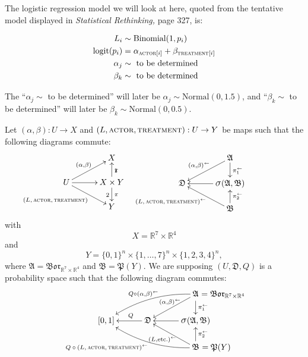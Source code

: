 \documentclass[
twoside=true,
paper=letter,
fontsize=9pt,
pagesize=auto,
leqno,
openany,
headsepline,
overfullrule,
]{scrbook}
\theoremstyle{plain}
\theoremstyle{plain}
\theoremstyle{definition}
\theoremstyle{bfnoteitalic}
\theoremstyle{bfnoteroman}
\newcommand{\sigalg}[1]{\mathfrak{#1}}
\newcommand{\borel}{\mathfrak{Bor}}
\newcommand{\sagb}{\mathop{\hbox{\large{$\sigma$}}}\nolimits}
\newcommand{\preimage}[1]{\mathop{#1^{\leftarrow}}}
\newcommand{\R}{\mathbb{R}}
\newcommand{\productsig}[2]{\sagb(#1,#2)}
\newcommand{\powerset}{\mathfrak{P}}
\newcommand{\measurespace}{X}
\newcommand{\measurespaceii}{Y}
\newcommand{\projectionone}{\pi_1}
\newcommand{\projectiontwo}{\pi_2}
\newcommand{\pspace}{\measurespace}%
\newcommand{\sspace}{\measurespaceii}%
\newcommand{\sspacesig}{\sigalg{B}}
\newcommand{\pspacesig}{\sigalg{A}}
\begin{document}
The logistic regression model we will look at here, 
quoted from the tentative model displayed in \textsl{Statistical Rethinking,} page 327, is:
\begin{quoting}\small
\begin{align*}
L_i & \sim \text{Binomial}(1,p_i) \\
\text{logit}(p_i) & = \alpha_{\textsc{actor}[i]} + \beta_{\textsc{treatment}[i]} \\
\alpha_j & \sim \text{ to be determined} \\
\beta_k & \sim \text{ to be determined} \\
\end{align*}
\end{quoting}
The ``$\alpha_j \sim$  to be determined'' will later be
$\alpha_j  \sim \text{Normal}(0,1.5)$, and
``$\beta_k  \sim$ to be determined'' will later be
$\beta_k  \sim \text{Normal}(0,0.5)$.


Let  $(\alpha, \beta):U\to\pspace$ and $(L,\textsc{actor}, \textsc{treatment}):U\to\sspace$ 
be maps such that the following diagrams commute:
\[
\xymatrix@R=16pt@C=30pt{ 
 & \pspace 
 \\
 U \ar[ur]^{(\alpha, \beta)} 
 \ar[dr]_{\llap{\scriptsize{$(L,\textsc{actor}, \textsc{treatment})$}}}
 \ar[r] & 
 \pspace\times\sspace \ar[u]_\projectionone \ar[d]^\projectiontwo
 \\
  & \sspace \\
}
%
\hspace{60pt}
%
\xymatrix@R=16pt@C=30pt{ 
 & \pspacesig
 \ar[dl]_{\preimage{(\alpha,\beta)}} 
 \ar[d]^{\preimage{\projectionone}}
 \\
 \sigalg{D}  & 
 \productsig{\pspacesig}{\sspacesig} 
 \ar[l]  
 \\
  & \sspacesig
  \ar[u]_{\preimage{\projectiontwo}}
  \ar[ul]^{\preimage{\llap{\scriptsize{$(L,\textsc{actor}, \textsc{treatment})$}}}}
  \\
}
\]
with
\[
\pspace = \R^7 \times \R^4
\]
and
\[
\sspace =
\{0,1\}^n \times \{ 1,\ldots,7 \}^n \times \{1,2,3,4 \}^n,
\]
where 
$\pspacesig = \borel_{\R^7 \times \R^4}$ and $\sspacesig=\powerset(\sspace)$.
We are supposing $(U,\sigalg{D},Q)$ is a probability space such that the following diagram commutes:
\[
\xymatrix@R=16pt@C=30pt{ 
 & & \pspacesig \rlap{ $=\borel_{\R^7\times\R^4}$}
 \ar[dl]_{\kern30pt\preimage{(\alpha,\beta)}} 
 \ar[d]^{\preimage{\projectionone}}
 \ar@/_10pt/[lld]_{Q\circ \preimage{(\alpha,\beta)}}
 \\
 [0,1] & \sigalg{D} \ar[l]_-{\ Q} & 
 \productsig{\pspacesig}{\sspacesig} 
 \ar[l]  
 \\
 & & \sspacesig \rlap{ $=\powerset(\sspace)$}
  \ar[u]_{\preimage{\projectiontwo}}
  \ar[ul]^{\preimage{(L,\text{etc.})}}
  \ar@/^10pt/[llu]^{\llap{\scriptsize{$Q\circ\preimage{(L,\textsc{actor},\textsc{treatment})}$}}}
  \\
}
\]
\end{document}
